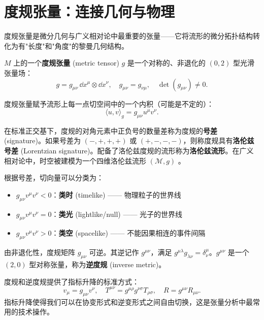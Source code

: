 \section{度规张量：连接几何与物理}

度规张量是微分几何与广义相对论中最重要的张量——它将流形的微分拓扑结构转化为有"长度"和"角度"的黎曼几何结构。

\begin{definition}[度规张量]
$M$ 上的一个\textbf{度规张量} (metric tensor) $g$ 是一个对称的、非退化的 $(0,2)$ 型光滑张量场：
\begin{equation}
    g = g_{\mu\nu} \, \dd x^\mu \otimes \dd x^\nu, \quad g_{\mu\nu} = g_{\nu\mu}, \quad \det(g_{\mu\nu}) \neq 0.
\end{equation}
\end{definition}

度规张量赋予流形上每一点切空间中的一个内积（可能是不定的）：
\begin{equation}
    \langle u, v \rangle_g = g_{\mu\nu} u^\mu v^\nu.
\end{equation}

\begin{definition}[号差与洛伦兹流形]
在标准正交基下，度规的对角元素中正负号的数量差称为度规的\textbf{号差} (signature)。如果号差为 $(-,+,+,+)$ 或 $(+,-,-,-)$，则称度规具有\textbf{洛伦兹号差} (Lorentzian signature)。配备了洛伦兹度规的流形称为\textbf{洛伦兹流形}。在广义相对论中，时空被建模为一个四维洛伦兹流形 $(\mathcal{M}, g)$ \cite{Wald1984}。
\end{definition}

根据号差，切向量可以分类为：
\begin{itemize}
    \item $g_{\mu\nu} v^\mu v^\nu < 0$：\textbf{类时} (timelike) —— 物理粒子的世界线
    \item $g_{\mu\nu} v^\mu v^\nu = 0$：\textbf{类光} (lightlike/null) —— 光子的世界线
    \item $g_{\mu\nu} v^\mu v^\nu > 0$：\textbf{类空} (spacelike) —— 不能因果相连的事件间隔
\end{itemize}

\begin{definition}[逆度规]
由非退化性，度规矩阵 $g_{\mu\nu}$ 可逆。其逆记作 $g^{\mu\nu}$，满足 $g^{\mu\lambda} g_{\lambda\nu} = \delta^\mu_\nu$。$g^{\mu\nu}$ 是一个 $(2,0)$ 型对称张量，称为\textbf{逆度规} (inverse metric)。
\end{definition}

度规和逆度规提供了指标升降的标准方式：
\begin{equation}
    v_\mu = g_{\mu\nu} v^\nu, \quad T^{\mu\nu} = g^{\mu\rho} g^{\nu\sigma} T_{\rho\sigma}, \quad R = g^{\mu\nu} R_{\mu\nu}.
\end{equation}
指标升降使得我们可以在协变形式和逆变形式之间自由切换，这是张量分析中最常用的技术操作。

